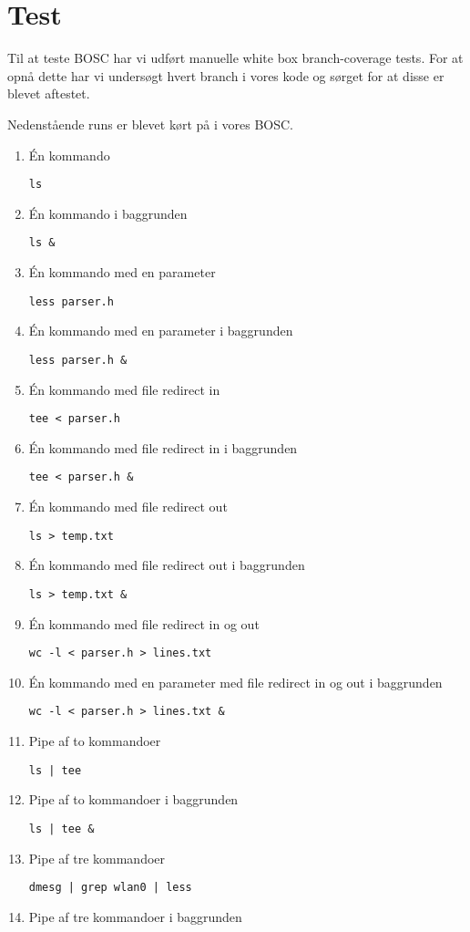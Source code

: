 \section{Test}
Til at teste BOSC har vi udført manuelle white box branch-coverage tests. For at opnå dette har vi undersøgt hvert branch i vores kode og sørget for at disse er blevet aftestet.

Nedenstående runs er blevet kørt på i vores BOSC.

\begin{enumerate}
	\item Én kommando
	
	\verb+ls+
	\item Én kommando i baggrunden
	
	\verb+ls &+
	\item Én kommando med en parameter
	
	\verb+less parser.h+
	\item Én kommando med en parameter i baggrunden
	
	\verb+less parser.h &+
	\item Én kommando med file redirect in
	
	\verb+tee < parser.h+
	\item Én kommando med file redirect in i baggrunden
	
	\verb+tee < parser.h &+
	\item Én kommando med file redirect out
	
	\verb+ls > temp.txt+
	\item Én kommando med file redirect out i baggrunden
	
	\verb+ls > temp.txt &+
	\item Én kommando med file redirect in og out
	
	\verb+wc -l < parser.h > lines.txt+
	\item Én kommando med en parameter med file redirect in og out i baggrunden
	
	\verb+wc -l < parser.h > lines.txt &+
	\item Pipe af to kommandoer
	
	\verb+ls | tee+
	\item Pipe af to kommandoer i baggrunden
	
	\verb+ls | tee &+
	\item Pipe af tre kommandoer
	
	\verb+dmesg | grep wlan0 | less+
	\item Pipe af tre kommandoer i baggrunden
	

\end{enumerate}
